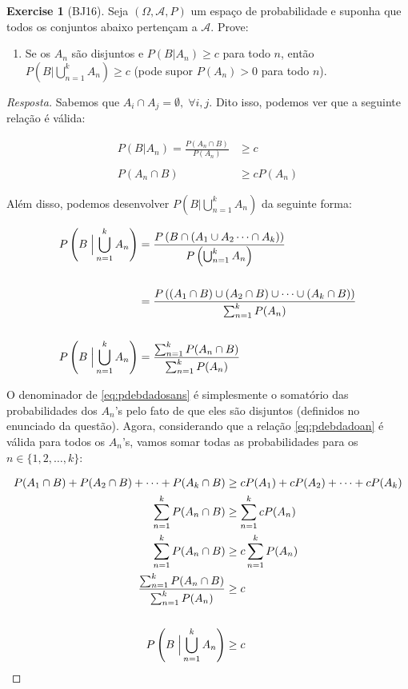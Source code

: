 \documentclass[
]{article}
\providecommand{\tightlist}{%
  \setlength{\itemsep}{0pt}\setlength{\parskip}{0pt}}
\theoremstyle{definition}
\theoremstyle{definition}
\theoremstyle{definition}
\newtheorem{exercise}{Exercise}[section]
\theoremstyle{definition}
\theoremstyle{remark}
\begin{document}
\begin{exercise}[BJ16]

Seja \((\Omega, \mathcal{A},P)\) um espaço de probabilidade e suponha que todos os conjuntos abaixo pertençam a \(\mathcal{A}\). Prove:

\begin{enumerate}
\def\labelenumi{\alph{enumi})}
\tightlist
\item
  Se os \(A_{n}\) são disjuntos e \(P(B|A_{n}) \ge c\) para todo \(n\), então \(P(B|\bigcup_{n=1}^{k}A_{n}) \ge c\) (pode supor \(P(A_{n}) > 0\) para todo \(n\)).
\end{enumerate}

\begin{proof}[Resposta]
Sabemos que \(A_{i} \cap A_{j} = \emptyset, \; \forall i,j\). Dito isso, podemos ver que a seguinte relação é válida:

\begin{align}
P(B|A_{n}) = \frac{P(A_{n} \cap B)}{P(A_{n})} &\ge c \nonumber \\ \nonumber \\
P(A_{n} \cap B) &\ge cP(A_{n})
\label{eq:pdebdadoan}
\end{align}

Além disso, podemos desenvolver \(P(B|\bigcup_{n=1}^{k}A_{n})\) da seguinte forma:

\begin{align}
P\left(B \; \Big{|} \bigcup_{n=1}^{k}A_{n}\right) &= \frac{P\left(B \cap (A_{1} \cup A_{2} \dots \cap A_{k})\right)}{P\left(\bigcup_{n=1}^{k}A_{n}\right)} \nonumber \\ \nonumber \\
&= \frac{P\left((A_{1} \cap B) \cup (A_{2} \cap B) \cup \dots \cup (A_{k} \cap B)\right)}{\sum_{n = 1}^{k}P(A_{n})} \nonumber \\ \nonumber \\
P\left(B \; \Big{|} \bigcup_{n=1}^{k}A_{n}\right) &= \frac{\sum_{n=1}^{k}P(A_{n} \cap B)}{\sum_{n = 1}^{k}P(A_{n})}
\label{eq:pdebdadosans}
\end{align}

O denominador de \eqref{eq:pdebdadosans} é simplesmente o somatório das probabilidades dos \(A_{n}\)'s pelo fato de que eles são disjuntos (definidos no enunciado da questão). Agora, considerando que a relação \eqref{eq:pdebdadoan} é válida para todos os \(A_{n}\)'s, vamos somar todas as probabilidades para os \(n \in \{1,2,\dots,k\}\):

\begin{align*}
P(A_{1} \cap B) + P(A_{2} \cap B) + \dots + P(A_{k} \cap B) &\ge cP(A_{1}) + cP(A_{2}) + \dots + cP(A_{k}) \\
\sum_{n=1}^{k}P(A_{n} \cap B) &\ge \sum_{n=1}^{k}cP(A_{n}) \\
\sum_{n=1}^{k}P(A_{n} \cap B) &\ge c\sum_{n=1}^{k}P(A_{n}) \\
\frac{\sum_{n=1}^{k}P(A_{n} \cap B)}{\sum_{n=1}^{k}P(A_{n})} &\ge c \\ \\
P\left(B \; \Big{|} \bigcup_{n=1}^{k}A_{n}\right) &\ge c
\end{align*}
\end{proof}


\end{exercise}
\end{document}
